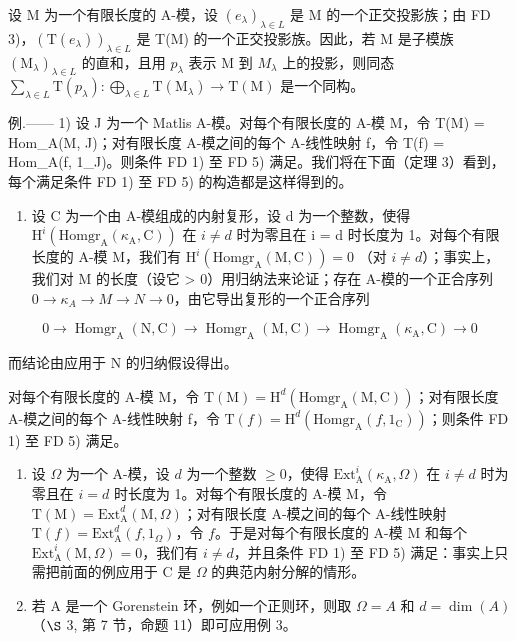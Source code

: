 设 M 为一个有限长度的 A-模，设 \((e_{\lambda})_{\lambda \in L}\) 是 M 的一个正交投影族；由 FD 3)，\((\mathrm{T}(e_{\lambda}))_{\lambda \in L}\) 是 T(M) 的一个正交投影族。因此，若 M 是子模族 \((\mathrm{M}_{\lambda})_{\lambda \in L}\) 的直和，且用 \(p_{\lambda}\) 表示 M 到 \(M_{\lambda}\) 上的投影，则同态 \(\sum_{\lambda \in L} \mathrm{T}(p_{\lambda}) : \bigoplus_{\lambda \in L} \mathrm{T}(\mathrm{M}_{\lambda}) \longrightarrow \mathrm{T}(\mathrm{M})\) 是一个同构。

例.—— 1) 设 J 为一个 Matlis A-模。对每个有限长度的 A-模 M，令 T(M) = Hom\_A(M, J)；对有限长度 A-模之间的每个 A-线性映射 f，令 T(f) = Hom\_A(f, 1\_J)。则条件 FD 1) 至 FD 5) 满足。我们将在下面（定理 3）看到，每个满足条件 FD 1) 至 FD 5) 的构造都是这样得到的。

\begin{enumerate}
\def\labelenumi{\arabic{enumi})}
\setcounter{enumi}{1}
\tightlist
\item
  设 C 为一个由 A-模组成的内射复形，设 d 为一个整数，使得 \(\mathrm{H}^{i}(\mathrm{Homgr}_{\mathrm{A}}(\kappa_{\mathrm{A}},\mathrm{C}))\) 在 \(i \neq d\) 时为零且在 i = d 时长度为 1。对每个有限长度的 A-模 M，我们有 \(\mathrm{H}^{i}(\mathrm{Homgr}_{\mathrm{A}}(\mathrm{M},\mathrm{C})) = 0\) （对 \(i \neq d\)）；事实上，我们对 M 的长度（设它 \textgreater{} 0）用归纳法来论证；存在 A-模的一个正合序列 \(0 \to \kappa_{A} \to M \to N \to 0\)，由它导出复形的一个正合序列
\end{enumerate}

\[
0 \rightarrow \operatorname{Homgr} _ {\mathrm{A}} (\mathrm{N}, \mathrm{C}) \longrightarrow \operatorname{Homgr} _ {\mathrm{A}} (\mathrm{M}, \mathrm{C}) \longrightarrow \operatorname{Homgr} _ {\mathrm{A}} (\kappa_ {\mathrm{A}}, \mathrm{C}) \longrightarrow 0
\]

而结论由应用于 N 的归纳假设得出。

对每个有限长度的 A-模 M，令 \(\mathrm{T}(\mathrm{M})=\mathrm{H}^{d}(\mathrm{Homgr}_{\mathrm{A}}(\mathrm{M},\mathrm{C}))\)；对有限长度 A-模之间的每个 A-线性映射 f，令 \(\mathrm{T}(f)=\mathrm{H}^{d}(\mathrm{Homgr}_{\mathrm{A}}(f,1_{\mathrm{C}}))\)；则条件 FD 1) 至 FD 5) 满足。

\begin{enumerate}
\def\labelenumi{\arabic{enumi})}
\setcounter{enumi}{2}
\item
  设 \(\Omega\) 为一个 A-模，设 \(d\) 为一个整数 \(\geqslant 0\)，使得 \(\mathrm{Ext}_{\mathrm{A}}^{i}(\kappa_{\mathrm{A}},\Omega)\) 在 \(i\neq d\) 时为零且在 \(i = d\) 时长度为 1。对每个有限长度的 A-模 M，令 \(\mathrm{T(M)} = \mathrm{Ext}_{\mathrm{A}}^{d}(\mathrm{M},\Omega)\)；对有限长度 A-模之间的每个 A-线性映射 \(\mathrm{T}(f) = \mathrm{Ext}_{\mathrm{A}}^{d}(f,1_{\Omega})\)，令 \(f\)。于是对每个有限长度的 A-模 M 和每个 \(\mathrm{Ext}_{\mathrm{A}}^{i}(\mathrm{M},\Omega) = 0\)，我们有 \(i\neq d\)，并且条件 FD 1) 至 FD 5) 满足：事实上只需把前面的例应用于 C 是 \(\Omega\) 的典范内射分解的情形。
\item
  若 A 是一个 Gorenstein 环，例如一个正则环，则取 \(\Omega = A\) 和 \(d = \dim(A)\)（\(\S\) 3, 第 7 节，命题 11）即可应用例 3。
\end{enumerate}

